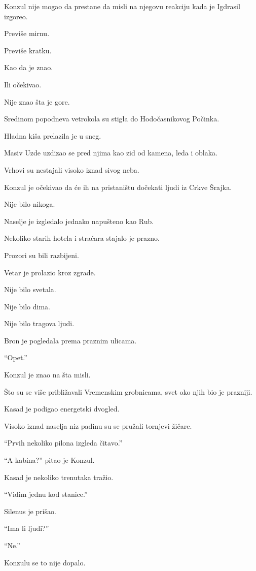 Konzul nije mogao da prestane da misli na njegovu reakciju kada je Igdrasil izgoreo.

Previše mirnu.

Previše kratku.

Kao da je znao.

Ili očekivao.

Nije znao šta je gore.

\bigskip

Sredinom popodneva vetrokola su stigla do Hodočasnikovog Počinka.

Hladna kiša prelazila je u sneg.

Masiv Uzde uzdizao se pred njima kao zid od kamena, leda i oblaka.

Vrhovi su nestajali visoko iznad sivog neba.

Konzul je očekivao da će ih na pristaništu dočekati ljudi iz Crkve Šrajka.

Nije bilo nikoga.

Naselje je izgledalo jednako napušteno kao Rub.

Nekoliko starih hotela i straćara stajalo je prazno.

Prozori su bili razbijeni.

Vetar je prolazio kroz zgrade.

Nije bilo svetala.

Nije bilo dima.

Nije bilo tragova ljudi.

Bron je pogledala prema praznim ulicama.

``Opet.''

Konzul je znao na šta misli.

Što su se više približavali Vremenskim grobnicama, svet oko njih bio je prazniji.

\bigskip

Kasad je podigao energetski dvogled.

Visoko iznad naselja niz padinu su se pružali tornjevi žičare.

``Prvih nekoliko pilona izgleda čitavo.''

``A kabina?'' pitao je Konzul.

Kasad je nekoliko trenutaka tražio.

``Vidim jednu kod stanice.''

Silenus je prišao.

``Ima li ljudi?''

``Ne.''

Konzulu se to nije dopalo.

